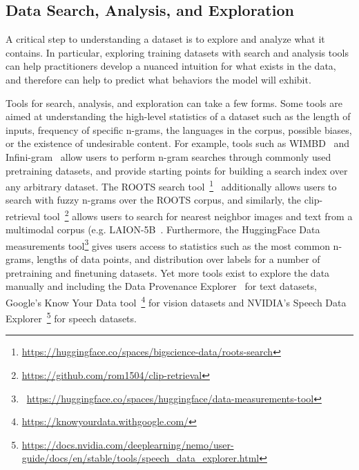 \subsection{Data Search, Analysis, and Exploration}

A critical step to understanding a dataset is to explore and analyze what it contains. In particular, exploring training datasets with search and analysis tools can help practitioners develop a nuanced intuition for what exists in the data, and therefore can help to predict what behaviors the model will exhibit.

Tools for search, analysis, and exploration can take a few forms. Some tools are aimed at understanding the high-level statistics of a dataset such as the length of inputs, frequency of specific n-grams, the languages in the corpus, possible biases, or the existence of undesirable content. For example, tools such as WIMBD~\citep{elazar2023whats} and Infini-gram~\citep{Liu2024InfiniGram} allow users to perform n-gram searches through commonly used pretraining datasets, and provide starting points for building a search index over any arbitrary dataset. The ROOTS search tool~\footnote{\url{https://huggingface.co/spaces/bigscience-data/roots-search}}~\citep{piktus2023roots} additionally allows users to search with fuzzy n-grams over the ROOTS corpus, and similarly, the clip-retrieval tool~\footnote{\url{https://github.com/rom1504/clip-retrieval}}\citep{beaumont-2022-clip-retrieval} allows users to search for nearest neighbor images and text from a multimodal corpus (e.g. LAION-5B~\citep{schuhmann2022laion5b}. Furthermore, the HuggingFace Data measurements tool\footnote{~\url{https://huggingface.co/spaces/huggingface/data-measurements-tool}} gives users access to statistics such as the most common n-grams, lengths of data points, and distribution over labels for a number of pretraining and finetuning datasets.
Yet more tools exist to explore the data manually and including the Data Provenance Explorer~\citep{longpre2023data} for text datasets, Google's Know Your Data tool~\footnote{\url{https://knowyourdata.withgoogle.com/}} for vision datasets and NVIDIA's Speech Data Explorer~\footnote{\url{https://docs.nvidia.com/deeplearning/nemo/user-guide/docs/en/stable/tools/speech_data_explorer.html}} for speech datasets.

